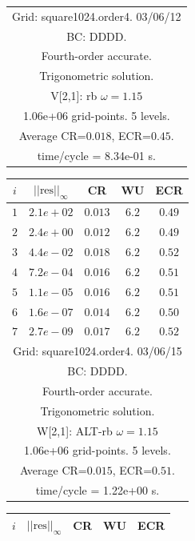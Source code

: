 \begin{table}[hbt]
\begin{center}
{\begin{tabular}{|c|c|c|c|c|}
\hline 
\multicolumn{5}{|c|}{Grid: square1024.order4. 03/06/12}  \\
\multicolumn{5}{|c|}{BC: DDDD.}  \\
\multicolumn{5}{|c|}{Fourth-order accurate.}  \\
\multicolumn{5}{|c|}{Trigonometric solution.}  \\
\multicolumn{5}{|c|}{V[2,1]: rb $\omega=1.15$}  \\
\multicolumn{5}{|c|}{1.06e+06 grid-points. 5 levels.}  \\
\multicolumn{5}{|c|}{Average CR=$0.018$, ECR=$0.45$.}  \\
\multicolumn{5}{|c|}{time/cycle = 8.34e-01 s.}  \\
\hline 
\end{tabular}
\begin{tabular}{|c|c|c|c|c|} \hline 
 $i$   & $\vert\vert\mbox{res}\vert\vert_\infty$  &  CR     &  WU    & ECR  \\   \hline 
 $ 1$  & $ 2.1e+02$ & $0.013$ & $ 6.2$ & $0.49$ \\ 
 $ 2$  & $ 2.4e+00$ & $0.012$ & $ 6.2$ & $0.49$ \\ 
 $ 3$  & $ 4.4e-02$ & $0.018$ & $ 6.2$ & $0.52$ \\ 
 $ 4$  & $ 7.2e-04$ & $0.016$ & $ 6.2$ & $0.51$ \\ 
 $ 5$  & $ 1.1e-05$ & $0.016$ & $ 6.2$ & $0.51$ \\ 
 $ 6$  & $ 1.6e-07$ & $0.014$ & $ 6.2$ & $0.50$ \\ 
 $ 7$  & $ 2.7e-09$ & $0.017$ & $ 6.2$ & $0.52$ \\ 
\hline 
\multicolumn{5}{|c|}{Grid: square1024.order4. 03/06/15}  \\
\multicolumn{5}{|c|}{BC: DDDD.}  \\
\multicolumn{5}{|c|}{Fourth-order accurate.}  \\
\multicolumn{5}{|c|}{Trigonometric solution.}  \\
\multicolumn{5}{|c|}{W[2,1]: ALT-rb $\omega=1.15$}  \\
\multicolumn{5}{|c|}{1.06e+06 grid-points. 5 levels.}  \\
\multicolumn{5}{|c|}{Average CR=$0.015$, ECR=$0.51$.}  \\
\multicolumn{5}{|c|}{time/cycle = 1.22e+00 s.}  \\
\hline 
\end{tabular}
\begin{tabular}{|c|c|c|c|c|} \hline 
 $i$   & $\vert\vert\mbox{res}\vert\vert_\infty$  &  CR     &  WU    & ECR  \\   \hline 

\end{tabular}}
\end{center}
\end{table}
